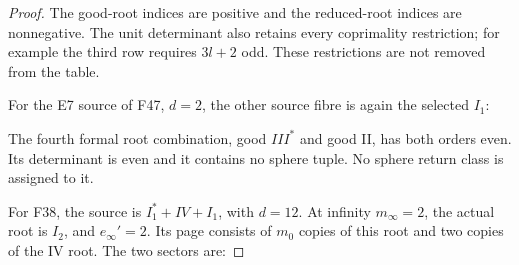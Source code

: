 \begin{proof}
The good-root indices are positive and the reduced-root indices
are nonnegative. The unit determinant also retains every
coprimality restriction; for example the third row requires
\(3l+2\) odd. These restrictions are not removed from the table.

For the E7 source of F47, \(d=2\), the other source fibre is again
the selected \(I_1\):

\par{}\par\medskip

The fourth formal root combination, good \(III^*\) and good II,
has both orders even. Its determinant is even and it contains
no sphere tuple. No sphere return class is assigned to it.

For F38, the source is \(I_1^*+IV+I_1\), with \(d=12\).
At infinity \(m_\infty=2\), the actual root is \(I_2\),
and \(e_\infty'=2\). Its page consists of \(m_0\) copies of this
root and two copies of the IV root. The two sectors are:

\par{}\par\medskip


\end{proof}
